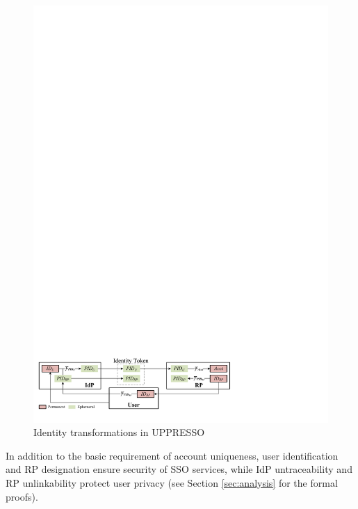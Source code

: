 \begin{figure}[tb]
  \centering
  \includegraphics[width=1.00\linewidth]{fig/IDCorrelation.pdf}
  \caption{Identity transformations in UPPRESSO} %
  \label{fig:IDCorrelation}
\end{figure}

In addition to the basic requirement of account uniqueness,
    user identification and RP designation ensure security of SSO services,
    while IdP untraceability and RP unlinkability protect user privacy
(see Section \ref{sec:analysis} for the formal proofs). 
